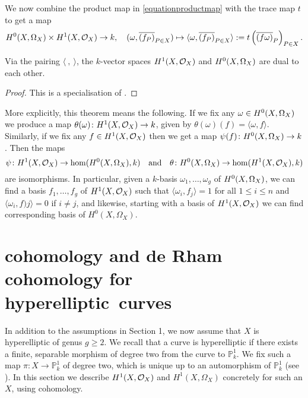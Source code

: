 We now combine the product map in \eqref{equationproductmap} with the trace map $t$ to get a map 
    \[
    {H^0(X,\Omega_X)} \times H^1(X,\mathcal{O}_X) \rightarrow k,\quad (\omega, \overline{(f_P)}_{P \in X}) \mapsto \langle \omega, \overline{(f_P)}_{P \in X} \rangle := t \left( \overline{(f \omega)}_P \right)_{P \in X}.
    \]

    \begin{thm}\label{theoremserreduality}
    Via the pairing $\langle\ ,\ \rangle$, the $k$-vector spaces $H^1(X,\mathcal{O}_X)$ and ${H^0(X,\Omega_X)}$ are dual to each other.
    \end{thm}
    \begin{proof}
    This is a specialisation of \cite[Chap.\ II, Thm.\ 2]{algebraicgroupsandclassfields}.
    \end{proof}

More explicitly, this theorem means the following.
If we fix any $\omega \in {H^0(X,\Omega_X)}$ we produce a map $\theta(\omega)\colon H^1(X,\mathcal{O}_X) \rightarrow k$, given by $\theta(\omega)(f) = \langle \omega , f\rangle$.
Similarly, if we fix any $f \in H^1(X,\mathcal{O}_X)$ then we get a map $\psi(f) \colon {H^0(X,\Omega_X)} \rightarrow k$.
Then the maps 
    \[
    \psi \colon H^1(X,\mathcal{O}_X) \rightarrow \hom(H^0(X,\Omega_X),k) \quad
    \text{and} \quad    
    \theta \colon H^0(X,\Omega_X) \rightarrow \hom(H^1(X,\mathcal{O}_X), k)
    \]
are isomorphisms.
In particular, given a $k$-basis $\omega_1, \ldots, \omega_g$ of ${H^0(X,\Omega_X)}$, we can find a basis $f_1, \ldots , f_g$ of $H^1(X,\mathcal{O}_X)$ such that $\langle \omega_i, f_j \rangle = 1$ for all $1 \leq i \leq n$ and $\langle \omega_i, f)j \rangle = 0$ if $i \neq j$, and likewise, starting with a basis of $H^1(X,\mathcal{O}_X)$ we can find corresponding basis of $H^0(X,\Omega_X)$. 


\section{\cech cohomology and de Rham cohomology for {hyperelliptic}~curves}

In addition to the assumptions in Section 1, we now assume that $X$ is hyperelliptic of genus $g \geq 2$.
We recall that a curve is hyperelliptic if there exists a finite, separable morphism of degree two from the curve to $\mathbb P_k^1$.
We fix such a map $\pi \colon X \rightarrow \mathbb P_k^1$ of degree two, which is unique up to an automorphism of $\mathbb P_k^1$ (see \cite[Rem.\ 7.4.30]{liu}).
In this section we describe $H^1(X,\mathcal{O}_X)$ and $H^1(X,\Omega_X)$ concretely for such an $X$, using \cech cohomology.

